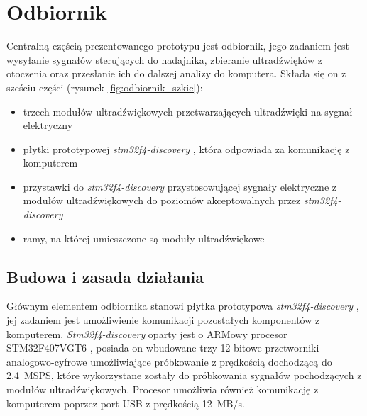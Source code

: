 \chapter{Odbiornik}


Centralną częścią prezentowanego prototypu jest odbiornik,
jego zadaniem jest wysyłanie sygnałów sterujących do nadajnika, zbieranie ultradźwięków z otoczenia oraz przesłanie
ich do dalszej analizy do komputera.
Składa się on z sześciu części (rysunek \ref{fig:odbiornik_szkic}):

\begin{itemize}
 \item trzech modułów ultradźwiękowych przetwarzających ultradźwięki na sygnał elektryczny
 \item płytki prototypowej \textit{stm32f4-discovery} \cite{bib:stm32f4Discovery}, która odpowiada za komunikację z komputerem
 \item przystawki do \textit{stm32f4-discovery} przystosowującej sygnały elektryczne z modułów ultradźwiękowych
  do poziomów akceptowalnych przez \textit{stm32f4-discovery}
 \item ramy, na której umieszczone są moduły ultradźwiękowe
\end{itemize}




\section{Budowa i zasada działania}

Głównym elementem odbiornika stanowi płytka prototypowa \textit{stm32f4-discovery} \cite{bib:stm32f4Discovery},
jej zadaniem jest umożliwienie komunikacji pozostałych komponentów z komputerem.
\textit{Stm32f4-discovery} oparty jest o ARMowy procesor STM32F407VGT6 \cite{bib:stm32f407}, posiada on wbudowane trzy 12 bitowe przetworniki
analogowo-cyfrowe umożliwiające próbkowanie z prędkością dochodzącą do \SI{2,4}{MSPS}, które wykorzystane zostały do próbkowania
sygnałów pochodzących z modułów ultradźwiękowych. Procesor umożliwia również komunikację z komputerem poprzez 
port USB z prędkością \SI{12}{MB/s}.

